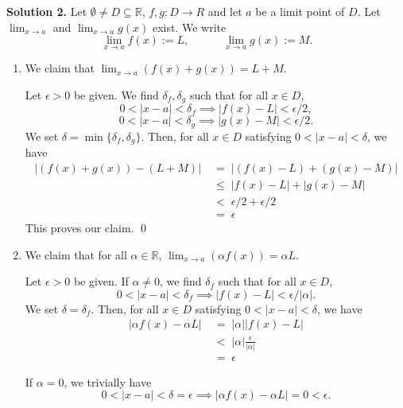 \documentclass[10pt]{article}
\begin{document}
        \textbf{Solution 2.}
        Let $\emptyset \neq D \subseteq \mathbb{R}$, $f, g\colon D \to R$ and let $a$ be a limit point of $D$.
        Let $\lim_{x\to a}$ and $\lim_{x\to a} g(x)$ exist. We write
        \[
        \lim_{x\to a} f(x) := L,        \quad\quad\quad \lim_{x\to a} g(x) := M.
        \]
        \begin{enumerate}
                \item We claim that $\lim_{x\to a}(f(x) + g(x)) = L + M$.

                Let $\epsilon > 0$ be given.
                We find $\delta_f, \delta_g$ such that for all $x \in D$,
                \[0 < |x - a| < \delta_f \implies |f(x) - L| < \epsilon/2,\]
                \[0 < |x - a| < \delta_g \implies |g(x) - M| < \epsilon/2.\]
                We set $\delta = \min\{\delta_f, \delta_g\}$. Then, for all $x \in D$ satisfying
                $0 < |x - a| < \delta$, we have
                \begin{align*}
                |(f(x) + g(x)) - (L + M)| \;&=\; |(f(x) - L) + (g(x) - M)| \\
                        \;&\le\; |f(x) - L| + |g(x) - M| \\
                        \;&<\; \epsilon/2 + \epsilon/2 \\
                        \;&=\; \epsilon
                \end{align*}
                This proves our claim. \qed

                \item We claim that for all $\alpha \in \mathbb{R}$, $\lim_{x\to a}(\alpha f(x)) = \alpha L$.

                Let $\epsilon > 0$ be given.
                If $\alpha \neq 0$, we find $\delta_f$ such that for all $x \in D$,
                \[0 < |x - a| < \delta_f \implies |f(x) - L| < \epsilon/|\alpha|.\]
                We set $\delta = \delta_f$. Then, for all $x \in D$ satisfying
                $0 < |x - a| < \delta$, we have
                \begin{align*}
                |\alpha f(x) - \alpha L| \;&=\; |\alpha| |f(x) - L| \\
                        \;&<\; |\alpha| \frac{\epsilon}{|\alpha|} \\
                        \;&=\; \epsilon
                \end{align*}

                If $\alpha = 0$, we trivially have
                \[0 < |x - a| < \delta = \epsilon \implies |\alpha f(x) - \alpha L| = 0 < \epsilon.\]


\end{enumerate}
\end{document}
